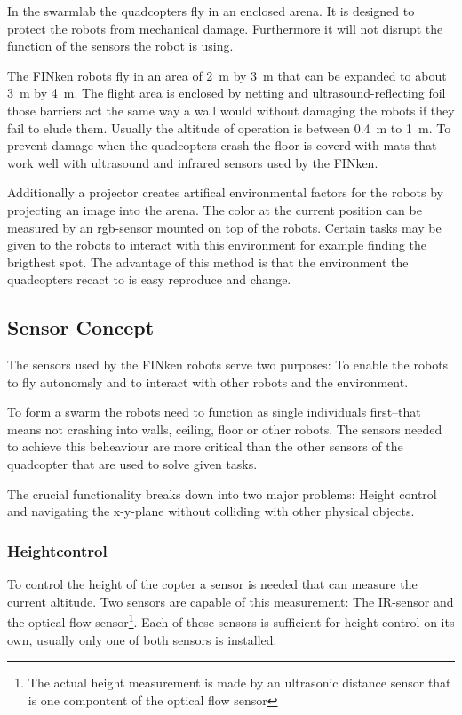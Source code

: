 In the swarmlab the quadcopters fly in an enclosed arena.
It is designed to protect the robots from mechanical damage.
Furthermore it will not disrupt the function of the sensors the robot is using.

The FINken robots fly in an area of \SI{2}{\metre} by \SI{3}{\metre} that can be expanded to about \SI{3}{\metre} by \SI{4}{\metre}.
The flight area is enclosed by netting and ultrasound-reflecting foil those barriers act the same way a wall would without damaging the robots if they fail to elude them.
Usually the altitude of operation is between \SI{0.4}{\metre} to \SI{1}{\metre}.
To prevent damage when the quadcopters crash the floor is coverd with mats that work well with ultrasound and infrared sensors used by the FINken.

Additionally a projector creates artifical environmental factors for the robots by projecting an image into the arena.
The color at the current position can be measured by an rgb-sensor mounted on top of the robots.
Certain tasks may be given to the robots to interact with this environment for example finding the brigthest spot.
The advantage of this method is that the environment the quadcopters recact to is easy reproduce and change.


\subsection{Sensor Concept}
The sensors used by the FINken robots serve two purposes: To enable the robots to fly autonomsly and to interact with other robots and the environment.

To form a swarm the robots need to function as single individuals first–that means not crashing into walls, ceiling, floor or other robots.
The sensors needed to achieve this beheaviour are more critical than the other sensors of the quadcopter that are used to solve given tasks.

The crucial functionality breaks down into two major problems: Height control and navigating the x-y-plane without colliding with other physical objects.

\subsubsection*{Heightcontrol}

To control the height of the copter a sensor is needed that can measure the current altitude.
Two sensors are capable of this measurement: The IR-sensor and the optical flow sensor\footnote{The actual height measurement is made by an ultrasonic distance sensor that is one compontent of the optical flow sensor}.
Each of these sensors is sufficient for height control on its own, usually only one of both sensors is installed.

